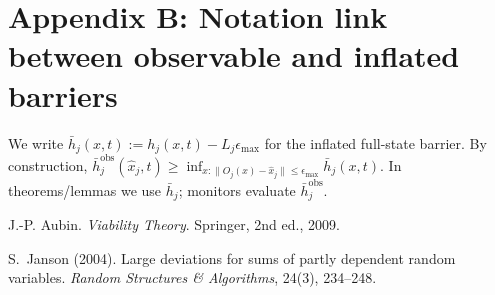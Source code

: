 \documentclass[11pt]{article}
\theoremstyle{definition}
\begin{document}
\section*{Appendix B: Notation link between observable and inflated barriers}
We write $\bar h_j(x,t):=h_j(x,t)-L_j\epsilon_{\max}$ for the inflated full-state barrier. By construction,
$\bar h^{\mathrm{obs}}_j(\hat x_j,t)\ge \inf_{x:\|O_j(x)-\hat x_j\|\le\epsilon_{\max}} \bar h_j(x,t)$.
In theorems/lemmas we use $\bar h_j$; monitors evaluate $\bar h^{\mathrm{obs}}_j$.

\begin{thebibliography}{9}

J.-P. Aubin.
\newblock \emph{Viability Theory}.
\newblock Springer, 2nd ed., 2009.

S.~Janson (2004).
\newblock Large deviations for sums of partly dependent random variables.
\newblock \emph{Random Structures \& Algorithms}, 24(3), 234--248.

\end{thebibliography}
\end{document}
